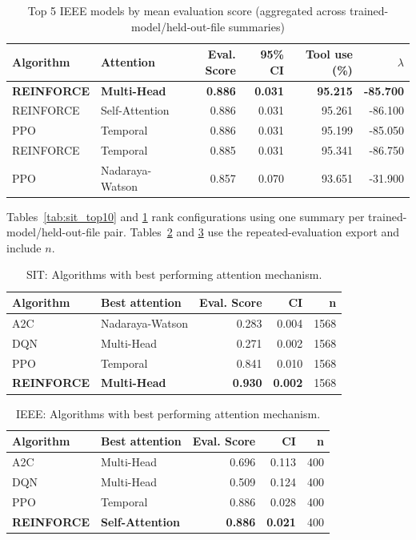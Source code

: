 \documentclass[sn-basic]{sn-jnl}%
\begin{document}
\begin{table}[htbp]
	\centering
	\caption{Top 5 IEEE models by mean evaluation score (aggregated across trained-model/held-out-file summaries)}
	\label{tab:ieee_top10}
	\begin{tabular}{ll r r r r}
	\toprule
	\textbf{Algorithm} & \textbf{Attention} & \textbf{Eval. Score} & \textbf{95\% CI} & \textbf{Tool use (\%)} & \textbf{$\lambda$}\\
	\midrule
	\textbf{REINFORCE} & \textbf{Multi-Head} & \textbf{0.886} & \textbf{0.031} & \textbf{95.215} & \textbf{-85.700}\\
	REINFORCE & Self-Attention 	& 0.886 & 0.031 & 95.261 & -86.100\\
	PPO & Temporal 				& 0.886 & 0.031 & 95.199 & -85.050\\
	REINFORCE & Temporal 		& 0.885 & 0.031 & 95.341 & -86.750\\
	PPO & Nadaraya-Watson 	& 0.857 & 0.070 & 93.651 & -31.900\\
	\bottomrule
	\end{tabular}
\end{table}

Tables~\ref{tab:sit_top10} and \ref{tab:ieee_top10} rank configurations using one summary per trained-model/held-out-file pair. Tables~\ref{tab:sit_best_attn} and \ref{tab:ieee_best_attn} use the repeated-evaluation export and include $n$.

\begin{table}[htbp]
	\caption{SIT: Algorithms with best performing attention mechanism.}
	\label{tab:sit_best_attn}
	\begin{tabular}{l l r r r}
	\toprule
	\textbf{Algorithm} & \textbf{Best attention} & \textbf{Eval. Score} & \textbf{CI} & \textbf{n}\\
	\midrule
		A2C & Nadaraya-Watson & 0.283 & 0.004 & 1568 \\
		DQN & Multi-Head & 0.271 & 0.002 & 1568 \\
		PPO & Temporal & 0.841 & 0.010 & 1568 \\
		\textbf{REINFORCE} & \textbf{Multi-Head} & \textbf{0.930} & \textbf{0.002} & 1568 \\
	\bottomrule
	\end{tabular}
\end{table}

\begin{table}[htbp]
	\centering
	\caption{IEEE: Algorithms with best performing attention mechanism.}
	\label{tab:ieee_best_attn}
	\begin{tabular}{l l r r r}
	\toprule
	\textbf{Algorithm} & \textbf{Best attention} & \textbf{Eval. Score} & \textbf{CI} & \textbf{n}\\
	\midrule
		A2C & Multi-Head & 0.696 & 0.113 & 400 \\
		DQN & Multi-Head & 0.509 & 0.124 & 400 \\
		PPO & Temporal & 0.886 & 0.028 & 400 \\
		\textbf{REINFORCE} & \textbf{Self-Attention} & \textbf{0.886} & \textbf{0.021} & 400 \\
	\bottomrule
	\end{tabular}
\end{table}
\end{document}
